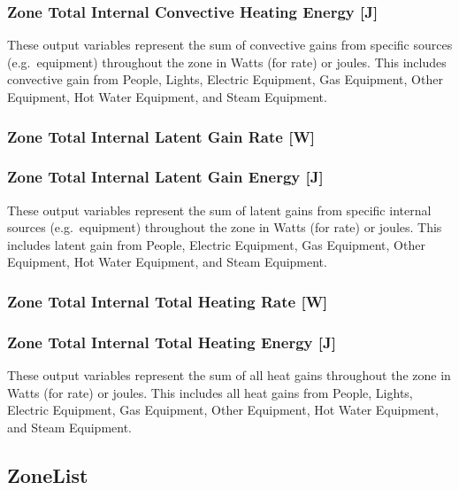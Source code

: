 \subsubsection{Zone Total Internal Convective Heating Energy {[}J{]}}\label{zone-total-internal-convective-heating-energy-j}

These output variables represent the sum of convective gains from specific sources (e.g.~equipment) throughout the zone in Watts (for rate) or joules. This includes convective gain from People, Lights, Electric Equipment, Gas Equipment, Other Equipment, Hot Water Equipment, and Steam Equipment.

\subsubsection{Zone Total Internal Latent Gain Rate {[}W{]}}\label{zone-total-internal-latent-gain-rate-w}

\subsubsection{Zone Total Internal Latent Gain Energy {[}J{]}}\label{zone-total-internal-latent-gain-energy-j}

These output variables represent the sum of latent gains from specific internal sources (e.g.~equipment) throughout the zone in Watts (for rate) or joules. This includes latent gain from People, Electric Equipment, Gas Equipment, Other Equipment, Hot Water Equipment, and Steam Equipment.

\subsubsection{Zone Total Internal Total Heating Rate {[}W{]}}\label{zone-total-internal-total-heating-rate-w}

\subsubsection{Zone Total Internal Total Heating Energy {[}J{]}}\label{zone-total-internal-total-heating-energy-j}

These output variables represent the sum of all heat gains throughout the zone in Watts (for rate) or joules. This includes all heat gains from People, Lights, Electric Equipment, Gas Equipment, Other Equipment, Hot Water Equipment, and Steam Equipment.

\subsection{ZoneList}\label{zonelist}

